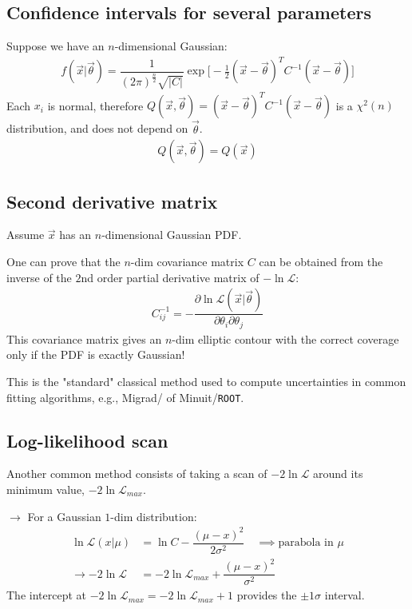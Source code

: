 
\subsection{Confidence intervals for several parameters} \label{conf_int_several_param}
Suppose we have an $n$-dimensional Gaussian:
\begin{align}
    f(\vec{x}|\vec{\theta}) = \dfrac{1}{(2\pi)^{\frac{n}{2}} \sqrt{|C|}} \exp \Big[- \frac{1}{2} (\vec{x}-\vec{\theta})^T C^{-1} (\vec{x} - \vec{\theta})\Big]
\end{align}
Each $x_i$ is normal, therefore $Q(\vec{x}, \vec{\theta}) = (\vec{x}-\vec{\theta})^T C^{-1} (\vec{x}-\vec{\theta})$ is a $\chi^2(n)$ distribution, and does not depend on $\vec{\theta}$.
\begin{align}
    Q(\vec{x}, \vec{\theta}) = Q(\vec{x})
\end{align}

\subsection{Second derivative matrix} \label{second_derivative_matrix}
Assume $\vec{x}$ has an $n$-dimensional Gaussian PDF. 

One can prove that the $n$-dim covariance matrix $C$ can be obtained from the inverse of the $2$nd order partial derivative matrix of $-\ln\mathcal{L}$:
\begin{align}
    C_{ij}^{-1} = - \dfrac{\partial \ln \mathcal{L}(\vec{x}|\vec{\theta})}{\partial \theta_i \partial \theta_j}
\end{align}
This covariance matrix gives an $n$-dim elliptic contour with the correct coverage only if the PDF is exactly Gaussian!

This is the "standard" classical method used to compute uncertainties in common fitting algorithms, e.g., Migrad/ of Minuit/\texttt{ROOT}.

\subsection{Log-likelihood scan} \label{log_likelihood_scan}
Another common method consists of taking a scan of $-2\ln\mathcal{L}$ around its minimum value, $-2\ln\mathcal{L}_{max}$.

$\to$ For a Gaussian $1$-dim distribution:
\begin{align}
    \ln\mathcal{L}(x|\mu) &= \ln C - \dfrac{(\mu - x)^2}{2\sigma^2} \quad \implies \text{parabola in $\mu$} \\
    \to -2 \ln \mathcal{L} &= -2 \ln \mathcal{L}_{max} + \dfrac{(\mu - x)^2}{\sigma^2}
\end{align}
The intercept at $-2 \ln \mathcal{L}_{max} = -2\ln \mathcal{L}_{max} + 1$ provides the $\pm1\sigma$ interval. 

